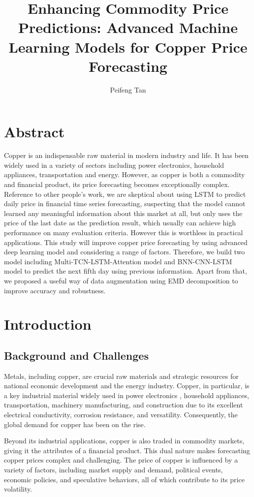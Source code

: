 \documentclass[final-report]{report-template}
\title{Enhancing Commodity Price Predictions: Advanced Machine Learning Models for Copper Price Forecasting}
\author{Peifeng Tan}
\begin{document}
\maketitlepage  %

\section*{Abstract}
Copper is an indispensable raw material in modern industry and life. It has been widely used in a variety of sectors including power electronics, household appliances, transportation and energy. However, as copper is both a commodity and financial product, its price forecasting becomes  exceptionally complex. Reference to other people's work, we are skeptical about using LSTM to predict daily price in financial time series forecasting, suspecting that the model cannot learned any meaningful information about this market at all, but only uses the price of the last date as the prediction result, which usually can achieve high performance on many evaluation criteria. However this is worthless in practical applications. This study will improve copper price forecasting by using advanced deep learning model and considering a range of factors. Therefore, we build two model including Multi-TCN-LSTM-Attention model and BNN-CNN-LSTM model to predict the next fifth day using previous information. Apart from that, we proposed a useful way of data augmentation using EMD decomposition to improve accuracy and robustness. 
\section{Introduction}
\subsection{Background and Challenges}
Metals, including copper, are crucial raw materials and strategic resources for national economic development and the energy industry. Copper, in particular, is a key industrial material widely used in power electronics \cite{sun2018freezing} , household appliances, transportation, machinery manufacturing, and construction due to its excellent electrical conductivity, corrosion resistance, and versatility. Consequently, the global demand for copper has been on the rise.

Beyond its industrial applications, copper is also traded in commodity markets, giving it the attributes of a financial product.\cite{frankel2010determinants,behmiri2015role} This dual nature makes forecasting copper prices complex and challenging. The price of copper is influenced by a variety of factors, \cite{BUNCIC20151}including market supply and demand, political events, economic policies, and speculative behaviors, all of which contribute to its price volatility.
\end{document}
